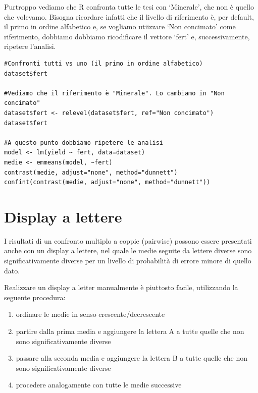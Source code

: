 \documentclass[a4paper,12pt,oneside]{book}
\providecommand{\tightlist}{%
  \setlength{\itemsep}{0pt}\setlength{\parskip}{0pt}}
\theoremstyle{definition}
\theoremstyle{definition}
\theoremstyle{definition}
\theoremstyle{remark}
\begin{document}
\normalsize

Purtroppo vediamo che R confronta tutte le tesi con `Minerale', che non
è quello che volevamo. Bisogna ricordare infatti che il livello di
riferimento è, per default, il primo in ordine alfabetico e, se vogliamo
utiizzare `Non concimato' come riferimento, dobbiamo dobbiamo
ricodificare il vettore `fert' e, successivamente, ripetere l'analisi.

\small

\begin{verbatim}
#Confronti tutti vs uno (il primo in ordine alfabetico)
dataset$fert

#Vediamo che il riferimento è "Minerale". Lo cambiamo in "Non concimato"
dataset$fert <- relevel(dataset$fert, ref="Non concimato")
dataset$fert

#A questo punto dobbiamo ripetere le analisi
model <- lm(yield ~ fert, data=dataset)
medie <- emmeans(model, ~fert)
contrast(medie, adjust="none", method="dunnett")
confint(contrast(medie, adjust="none", method="dunnett"))
\end{verbatim}

\normalsize

\section{Display a lettere}\label{display-a-lettere}

I risultati di un confronto multiplo a coppie (pairwise) possono essere
presentati anche con un display a lettere, nel quale le medie seguite da
lettere diverse sono significativamente diverse per un livello di
probabilità di errore minore di quello dato.

Realizzare un display a letter manualmente è piuttosto facile,
utilizzando la seguente procedura:

\begin{enumerate}
\def\labelenumi{\arabic{enumi}.}
\tightlist
\item
  ordinare le medie in senso crescente/decrescente
\item
  partire dalla prima media e aggiungere la lettera A a tutte quelle che
  non sono significativamente diverse
\item
  passare alla seconda media e aggiungere la lettera B a tutte quelle
  che non sono significativamente diverse
\item
  procedere analogamente con tutte le medie successive
\end{enumerate}
\end{document}
